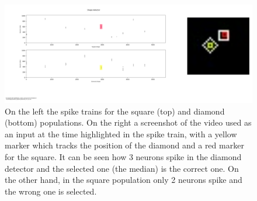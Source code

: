\begin{figure}[ht]
\centering
\includegraphics[width=\textwidth]{images/development/shape_detectors.png}
\caption[Shapes Detector with Square and Diamond]{On the left the spike trains for the square (top) and diamond (bottom) populations. On the right a screenshot of the video used as an input at the time highlighted in the spike train, with a yellow marker which tracks the position of the diamond and a red marker for the square. It can be seen how 3 neurons spike in the diamond detector and the selected one (the median) is the correct one. On the other hand, in the square population only 2 neurons spike and the wrong one is selected.}
\label{fig:shape_detectors}
\end{figure}

